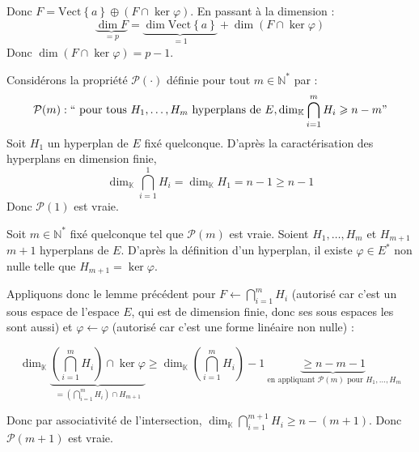 \documentclass{article}
\begin{document}
\begin{question_kholle}
		Donc $F = \text{Vect} \left\{ a \right\} \oplus (F \cap \ker \varphi)$.
		En passant à la dimension :
		$$
		\underbrace{ \dim F }_{= p } = \underbrace{ \dim \text{Vect} \left\{ a \right\} }_{ =1 } + \dim (F \cap \ker \varphi)
		$$
		Donc $\dim (F \cap \ker \varphi) = p - 1$.
		\newline \newline
		
		Considérons la propriété $\mathcal{P}(\cdot)$ définie pour tout $m \in \mathbb{N}^{*}$ par :
		$$
		\mathcal{P}(m) : \text{\textquotedblleft} \text{ pour tous } H_{1},\dots, H_{m} \text{ hyperplans de } E, \dim_{\mathbb{K}} \bigcap_{i=1}^{m}H_{i} \geqslant n-m \text{\textquotedblright}
		$$
		Soit $H_{1}$ un hyperplan de $E$ fixé quelconque. D'après la caractérisation des hyperplans en dimension finie, 
		$$
		\dim_{\mathbb{K}} \bigcap_{i=1}^{1}H_{i} = \dim_{\mathbb{K}}H_{1}= n-1 \geqslant n-1
		$$
		Donc $\mathcal{P}(1)$ est vraie.
		
		Soit $m \in \mathbb{N}^{*}$ fixé quelconque tel que $\mathcal{P}(m)$ est vraie.
		Soient $H_{1},\dots,H_{m}$ et $H_{m+1}$ $m+1$ hyperplans de $E$.
		D'après la définition d'un hyperplan, il existe $\varphi \in E ^{*}$ non nulle telle que $H_{m+1} = \ker \varphi$.
		
		Appliquons donc le lemme précédent pour $F \leftarrow \bigcap_{i=1}^{m}H_{i}$ (autorisé car c'est un sous espace de l'espace $E$, qui est de dimension finie, donc ses sous espaces les sont aussi) et $\varphi \leftarrow \varphi$ (autorisé car c'est une forme linéaire non nulle) :
		
		$$
		\dim_{\mathbb{K}} \underbrace{ \left( \bigcap_{i=1}^{m}H_{i} \right) \cap \ker \varphi  }_{ =\left( \bigcap_{i=1}^{m}H_{i}  \right)\cap H_{m+1} }\geqslant \dim_{\mathbb{K}} \left( \bigcap_{i=1}^{m}H_{i} \right) - 1 \underbrace{ \geqslant n - m - 1 }_{ \text{ en appliquant } \mathcal{P}(m) \text{ pour } H_{1},\dots,H_{m} }
		$$
		
		Donc par associativité de l'intersection, $\dim_{\mathbb{K}} \bigcap_{i=1}^{m+1}H_{i} \geqslant n - (m+1)$.
		Donc $\mathcal{P}(m+1)$ est vraie.
	\end{question_kholle}
\end{document}
